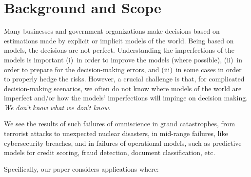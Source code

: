 \section{Background and Scope}

Many businesses and government organizations make decisions based on
estimations made by explicit or implicit models of the world.  Being
based on models, the decisions are not perfect.  Understanding the
imperfections of the models is important (i)~in order to improve the
models (where possible), (ii)~in order to prepare for the
decision-making errors, and (iii)~in some cases in order to properly
hedge the risks.  However, a crucial challenge is that, for 
complicated decision-making scenarios, we often do not know where 
models of the world are imperfect and/or how the models' imperfections
will impinge on decision making. \emph{ We don't know what we don't know.}

We see the results of such failures of omniscience in grand
catastrophes, from terrorist attacks to unexpected nuclear disasters,
in mid-range failures, like cybersecurity breaches, and in failures of
operational models, such as predictive models for credit scoring,
fraud detection, document classification, etc.


Specifically, our paper considers applications where:

